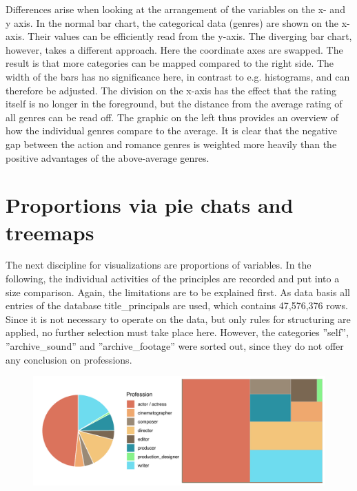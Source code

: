 Differences arise when looking at the arrangement of the variables on the x- and y axis. In the normal bar chart, the categorical data (genres) are shown on the x-axis. Their values can be efficiently read from the y-axis. The diverging bar chart, however, takes a different approach. Here the coordinate axes are swapped. The result is that more categories can be mapped compared to the right side. The width of the bars has no significance here, in contrast to e.g. histograms, and can therefore be adjusted. The division on the x-axis has the effect that the rating itself is no longer in the foreground, but the distance from the average rating of all genres can be read off. The graphic on the left thus provides an overview of how the individual genres compare to the average. It is clear that the negative gap between the action and romance genres is weighted more heavily than the positive advantages of the above-average genres.

\section*{Proportions via pie chats and treemaps}

The next discipline for visualizations are proportions of variables. In the following, the individual activities of the principles are recorded and put into a size comparison. Again, the limitations are to be explained first. As data basis all entries of the database title\_principals are used, which contains 47,576,376 rows. Since it is not necessary to operate on the data, but only rules for structuring are applied, no further selection must take place here. However, the categories ''self'', ''archive\_sound'' and ''archive\_footage'' were sorted out, since they do not offer any conclusion on professions.

\begin{figure}[caption={Porportions of prefessions via pie chart (left) and treemap}, label={fig:prop}]
	{\includegraphics[width=14.5cm]{figures/prop.pdf}}
\end{figure} 

